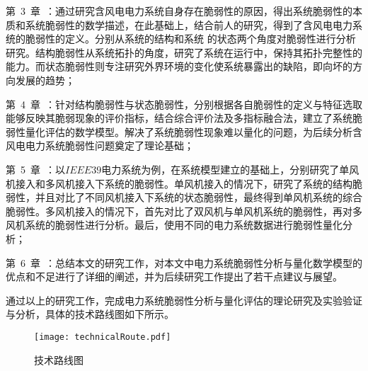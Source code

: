 第~3~章~：通过研究含风电电力系统自身存在脆弱性的原因，得出系统脆弱性的本质和系统脆弱性的数学描述，在此基础上，结合前人的研究，得到了含风电电力系统的脆弱性的定义。分别从系统的结构和系统
的状态两个角度对脆弱性进行分析研究。结构脆弱性从系统拓扑的角度，研究了系统在运行中，保持其拓扑完整性的能力。而状态脆弱性则专注研究外界环境的变化使系统暴露出的缺陷，即向坏的方向发展的趋势；

第~4~章~：针对结构脆弱性与状态脆弱性，分别根据各自脆弱性的定义与特征选取能够反映其脆弱现象的评价指标，结合综合评价法及多指标融合法，建立了系统脆弱性量化评估的数学模型。解决了系统脆弱性现象难以量化的问题，为后续分析含风电电力系统脆弱性问题奠定了理论基础；

第~5~章~：以$IEEE39$电力系统为例，在系统模型建立的基础上，分别研究了单风机接入和多风机接入下系统的脆弱性。单风机接入的情况下，研究了系统的结构脆弱性，并且对比了不同风机接入下系统的状态脆弱性，最终得到单风机系统的综合脆弱性。多风机接入的情况下，首先对比了双风机与单风机系统的脆弱性，再对多风机系统的脆弱性进行分析。最后，使用不同的电力系统数据进行脆弱性量化分析；

第~6~章~：总结本文的研究工作，对本文中电力系统脆弱性分析与量化数学模型的优点和不足进行了详细的阐述，并为后续研究工作提出了若干点建议与展望。

通过以上的研究工作，完成电力系统脆弱性分析与量化评估的理论研究及实验验证与分析，具体的技术路线图如下所示。
\begin{figure}[H] %
  \centering
  \texttt{[image: technicalRoute.pdf]}
  \caption{技术路线图}
  \label{fig:technicalRoute}
\end{figure}
